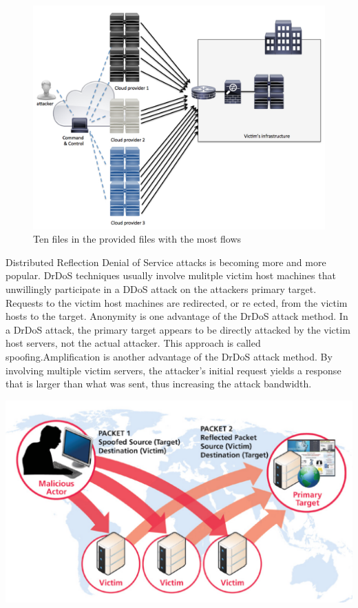 \begin{figure}[h!]
\caption{Ten files in the provided files with the most flows \citep{cisco_ddos}}
\includegraphics[scale=0.2]{cloud}
\end{figure}
Distributed Reflection Denial of Service attacks is becoming more and more popular. DrDoS techniques usually involve mulitple victim host machines that unwillingly participate in a DDoS attack on the attackers primary target. Requests to the victim host machines are redirected, or re ected, from the victim hosts to the target. Anonymity is one advantage of the DrDoS attack method. In a DrDoS attack, the primary target appears to be directly attacked by the victim host servers, not the actual attacker. This approach is called spoofing.Amplification is another advantage of the DrDoS attack method. By involving multiple victim servers, the attacker’s initial request yields a response that is larger than what was sent, thus increasing the attack bandwidth.

\includegraphics[scale=0.2]{drdos}

